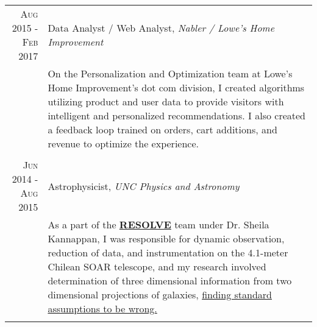 \documentclass[a4paper,10pt]{article} %
\begin{document}
\begin{tabular}{r|p{11cm}}

\textsc{Aug 2015 - Feb 2017} &  Data Analyst / Web Analyst, \emph{Nabler / Lowe's Home Improvement} \\
& \footnotesize{On the Personalization and Optimization team at Lowe's Home Improvement's dot com division, I created algorithms utilizing product and user data to provide visitors with intelligent and personalized recommendations. I also created a feedback loop trained on orders, cart additions, and revenue to optimize the experience.}\\

\multicolumn{2}{c}{} \\


\textsc{Jun 2014 - Aug 2015} & Astrophysicist, \emph{UNC Physics and Astronomy} \\ 
& \footnotesize{As a part of the \textbf{\href{http://resolve.astro.unc.edu/}{RESOLVE}} team under Dr. Sheila Kannappan, I was responsible for dynamic observation, reduction of data, and instrumentation on the 4.1-meter Chilean SOAR telescope, and my research involved determination of three dimensional information from two dimensional projections of galaxies, \href{https://ui.adsabs.harvard.edu/abs/2015AAS...22533611B/abstract}{finding standard assumptions to be wrong.}}\\
\multicolumn{2}{c}{} \\



\end{tabular}
\end{document}
